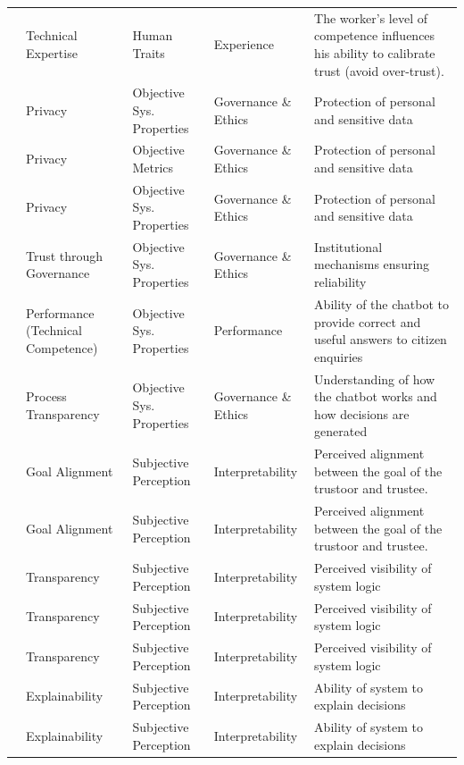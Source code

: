 \documentclass[sigconf]{acmart}
\begin{document}
\begin{longtable}{l l l l p{4cm}}
\cite{Aldoseri_et_al_2023} & Technical Expertise & Human Traits & Experience & The worker's level of competence influences his ability to calibrate trust (avoid over-trust). \\
\cite{aoki_chatbot_experimental} & Privacy & Objective Sys. Properties & Governance \& Ethics & Protection of personal and sensitive data \\
\cite{nazar_hci_xai_healthcare} & Privacy & Objective Metrics & Governance \& Ethics & Protection of personal and sensitive data \\
\cite{afroogh_trust_in_ai} & Privacy & Objective Sys. Properties & Governance \& Ethics & Protection of personal and sensitive data \\
\cite{afroogh_trust_in_ai} & Trust through Governance & Objective Sys. Properties & Governance \& Ethics & Institutional mechanisms ensuring reliability \\
\cite{aoki_chatbot_experimental} & Performance (Technical Competence) & Objective Sys. Properties & Performance & Ability of the chatbot to provide correct and useful answers to citizen enquiries \\
\cite{aoki_chatbot_experimental} & Process Transparency & Objective Sys. Properties & Governance \& Ethics & Understanding of how the chatbot works and how decisions are generated \\
\cite{afroogh_trust_in_ai} & Goal Alignment & Subjective Perception & Interpretability & Perceived alignment between the goal of the trustoor and trustee. \\
\cite{jacovi_2021_formalizing_trust_ai} & Goal Alignment & Subjective Perception & Interpretability & Perceived alignment between the goal of the trustoor and trustee. \\
\cite{afroogh_trust_in_ai} & Transparency & Subjective Perception & Interpretability & Perceived visibility of system logic \\
\cite{glickson_2020_review_of_empirical_research} & Transparency & Subjective Perception & Interpretability & Perceived visibility of system logic \\
\cite{Bingjie_2021} & Transparency & Subjective Perception & Interpretability & Perceived visibility of system logic \\
\cite{Trust_calibratiotrust_calibration_within_a_human-robot_team} & Explainability & Subjective Perception & Interpretability & Ability of system to explain decisions \\
\cite{vilone_longo_2021} & Explainability & Subjective Perception & Interpretability & Ability of system to explain decisions \\

\end{longtable}
\end{document}
